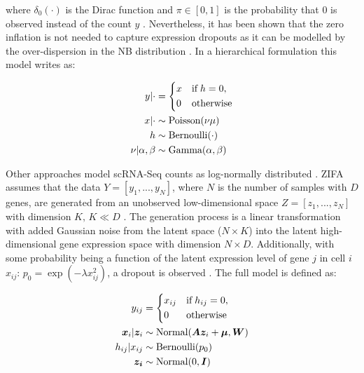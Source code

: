 where $\delta_0(\cdot)$ is the Dirac function and $\pi\in[0,1]$ is the probability that 0 is observed instead of the count $y$ \citep{Risso2018}. Nevertheless, it has been shown that the zero inflation is not needed to capture expression dropouts as it can be modelled by the over-dispersion in the NB distribution \citep{Lopez2018}. In a hierarchical formulation this model writes as:

\begin{align*}
y|\cdot & = 
 \left\lbrace
  \begin{aligned}
    & x && \textnormal{if} \; h = 0,  \\ 
    & 0 && \textnormal{otherwise}    	    
  \end{aligned}
\right.\\
x|\cdot&\sim{}\textnormal{Poisson}(\nu\mu)\\
h & \sim \textnormal{Bernoulli}(\cdot)\\
\nu|\alpha,\beta&\sim{}\textnormal{Gamma}(\alpha,\beta)
\end{align*}

Other approaches model scRNA-Seq counts as log-normally distributed \citep{Azizi2017,Pierson2015}. \Gls{ZIFA} assumes that the data $Y=[y_1,...,y_N]$, where $N$ is the number of samples with $D$ genes, are generated from an unobserved low-dimensional space $Z=[z_1,...,z_N]$ with dimension $K,\,{}K\ll{}D$ \citep{Pierson2015}. The generation process is a linear transformation with added Gaussian noise from the latent space ($N\times{}K$) into the latent high-dimensional gene expression space with dimension $N\times{}D$. Additionally, with some probability being a function of the latent expression level of gene $j$ in cell $i$ $x_{ij}$: $p_0=\exp(-\lambda{}x_{ij}^2)$, a dropout is observed \citep{Pierson2015}. The full model is defined as:

\begin{align*}
y_{ij} & = 
 \left\lbrace
  \begin{aligned}
    & x_{ij} && \textnormal{if} \; h_{ij} = 0,  \\ 
    & 0 && \textnormal{otherwise}    	    
  \end{aligned}
\right.\\
\bm{x}_{i}|\bm{z}_i&\sim{}\textnormal{Normal}(\bm{Az}_i+\bm{\mu},\bm{W})\\
h_{ij}|x_{ij} & \sim \textnormal{Bernoulli}(p_0)\\
\bm{z_i}&\sim{}\textnormal{Normal}(0,\bm{I})
\end{align*} 


